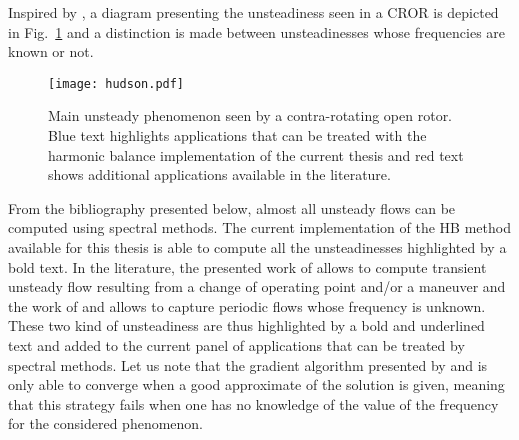 
Inspired by \citet{Hodson1998},
a diagram presenting the unsteadiness seen in 
a CROR is depicted in Fig.~\ref{fig:hudson} and a distinction
is made between unsteadinesses whose frequencies are
known or not.
\begin{figure}[htbp]
  \centering
  \texttt{[image: hudson.pdf]}
  \caption{Main unsteady phenomenon seen by a contra-rotating
  open rotor. Blue text highlights applications that can
  be treated with the harmonic balance implementation of the
  current thesis and red text shows additional applications
  available in the literature.}
  \label{fig:hudson}
\end{figure}
From the bibliography presented below, almost all
unsteady flows can be computed using spectral methods.
The current implementation of the HB method available for
this thesis is able to compute all the unsteadinesses highlighted
by a bold text. In the literature, the presented work of 
\citet{Mavriplis2012} allows to compute transient unsteady flow
resulting from a change of operating point and/or a maneuver and
the work of \citet{McMullen2002} and \citet{Gopinath2006} allows
to capture periodic flows whose frequency is unknown. These two
kind of unsteadiness are thus highlighted by a bold and underlined
text and added
to the current panel of applications that can
be treated by spectral methods. Let us note
that the gradient algorithm presented by \citet{McMullen2002}
and \citet{Gopinath2006} is only able to converge when a 
good approximate of the solution is given, meaning
that this strategy fails when one has no knowledge
of the value of the frequency for the considered phenomenon.
